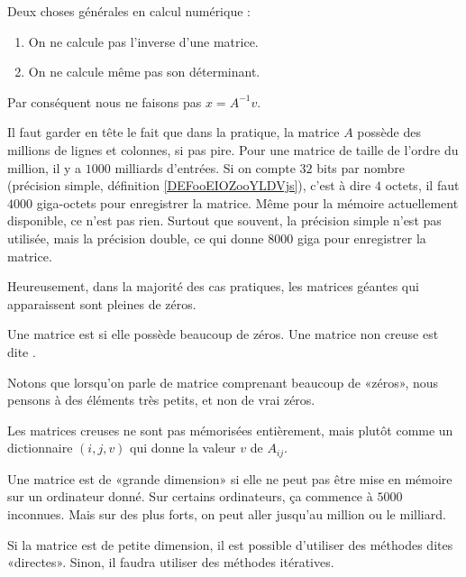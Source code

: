 \begin{normaltext}
    Deux choses générales en calcul numérique :
    \begin{enumerate}
        \item
            On ne calcule pas l'inverse d'une matrice.
        \item
            On ne calcule même pas son déterminant.
    \end{enumerate}
    Par conséquent nous ne faisons pas \( x=A^{-1}v\).

    Il faut garder en tête le fait que dans la pratique, la matrice \( A\) possède des millions de lignes et colonnes, si pas pire. Pour une matrice de taille de l'ordre du million, il y a \( 1000\) milliards d'entrées. Si on compte \( 32\) bits par nombre (précision simple, définition \ref{DEFooEIOZooYLDVjs}), c'est à dire \( 4\) octets, il faut \( 4000\) giga-octets pour enregistrer la matrice. Même pour la mémoire actuellement disponible, ce n'est pas rien. Surtout que souvent, la précision simple n'est pas utilisée, mais la précision double, ce qui donne \( 8000\) giga pour enregistrer la matrice.

    Heureusement, dans la majorité des cas pratiques, les matrices géantes qui apparaissent sont pleines de zéros.

\end{normaltext}

\begin{definition}
    Une matrice est  si elle possède beaucoup de zéros. Une matrice non creuse est dite .  
    
    Notons que lorsqu'on parle de matrice comprenant beaucoup de «zéros», nous pensons à des éléments très petits, et non de vrai zéros. 
\end{definition}
    Les matrices creuses ne sont pas mémorisées entièrement, mais plutôt comme un dictionnaire \( (i,j,v)\) qui donne la valeur \( v\) de \( A_{ij}\).

\begin{definition}
    Une matrice est de «grande dimension» si elle ne peut pas être mise en mémoire sur un ordinateur donné. Sur certains ordinateurs, ça commence à \( 5000\) inconnues. Mais sur des plus forts, on peut aller jusqu'au million ou le milliard.
\end{definition}

Si la matrice est de petite dimension, il est possible d'utiliser des méthodes dites «directes». Sinon, il faudra utiliser des méthodes itératives.

